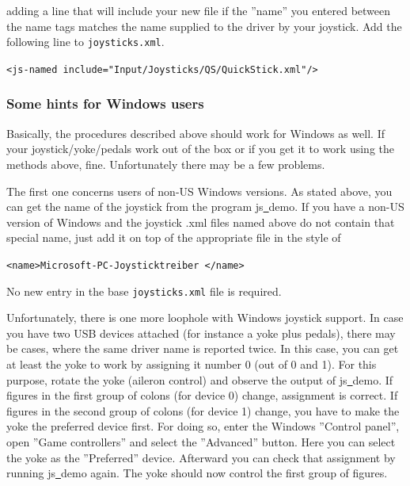 \noindent 
adding a line that will include your new file if the ''name'' you entered between the name tags matches the name supplied to the driver by your joystick.  Add the following line to \texttt{joysticks.xml}.
\medskip

\noindent
	\texttt{<js-named include="Input/Joysticks/QS/QuickStick.xml"/>}
\medskip

\subsubsection{Some hints for Windows users\label{joyxp}}
Basically, the procedures described above should work for Windows as well. If your joystick/yoke/pedals work out of the box or if you get it to work using the methods above, fine. Unfortunately there may be a few problems.

The first one concerns users of non-US Windows versions. As stated above, you can get the name of the joystick from the program js\underline{~}demo. If you have a non-US version of Windows and the joystick .xml files named above do not contain that special name, just add it on top of the appropriate file in the style of
\medskip

 \texttt{<name>Microsoft-PC-Joysticktreiber </name>}
 \medskip

\noindent
No new entry in the base \texttt{joysticks.xml} file is required.

Unfortunately, there is one more loophole with Windows joystick support. In
case you have two USB devices attached (for instance a yoke plus pedals),
there may be cases, where the same driver name is reported twice. In this
case, you can get at least the yoke to work by assigning it number 0 (out of
0 and 1). For this purpose, rotate the yoke (aileron control) and observe
the output of js\underline{~}demo. If figures in the first group of colons
(for device 0) change, assignment is correct. If figures in the second group
of colons (for device 1) change, you have to make the yoke the preferred
device first. For doing so, enter the
Windows ''Control panel'', open ''Game controllers'' and select the
''Advanced'' button. Here you can select the yoke as the ''Preferred''
device. Afterward you can check that assignment by running
js\underline{~}demo again. The yoke should now control the first group of
figures.

